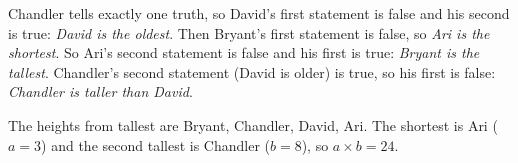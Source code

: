 Chandler tells exactly one truth, so David's first statement is false and his second is true: \emph{David is the oldest}. Then Bryant's first statement is false, so \emph{Ari is the shortest}. So Ari's second statement is false and his first is true: \emph{Bryant is the tallest}. Chandler's second statement (David is older) is true, so his first is false: \emph{Chandler is taller than David}.

The heights from tallest are Bryant, Chandler, David, Ari. The shortest is Ari ($a=3$) and the second tallest is Chandler ($b=8$), so $a\times b=\boxed{24}$.

